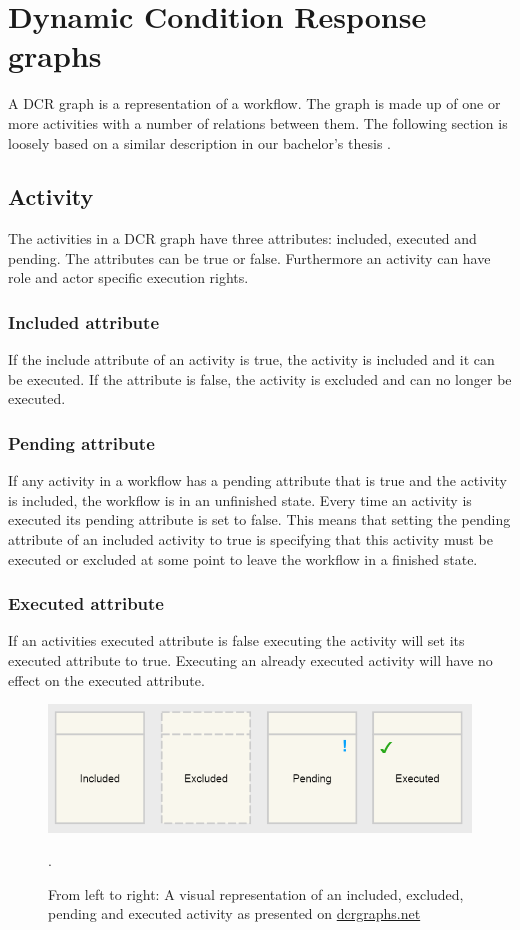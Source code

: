 \documentclass{article}
\begin{document}
	\section{Dynamic Condition Response graphs}
	\label{sec:dcr-graphs}
	A DCR graph is a representation of a workflow.
	The graph is made up of one or more activities with a number of relations between them. 
	The following section is loosely based on a similar description in our bachelor's thesis \cite{bachelor}. 

		\subsection{Activity}
		The activities in a DCR graph have three attributes: included, executed and pending. 
		The attributes can be true or false. 
		Furthermore an activity can have role and actor specific execution rights.

			\subsubsection{Included attribute}
			If the include attribute of an activity is true, the activity is included and it can be executed. 
			If the attribute is false, the activity is excluded and can no longer be executed.

			\subsubsection{Pending attribute}
			If any activity in a workflow has a pending attribute that is true and the activity is included, the workflow is in an unfinished state.
			Every time an activity is executed its pending attribute is set to false.
			This means that setting the pending attribute of an included activity to true is specifying that this activity must be executed or excluded at some point to leave the workflow in a finished state.

			\subsubsection{Executed attribute}
			If an activities executed attribute is false executing the activity will set its executed attribute to true.
			Executing an already executed activity will have no effect on the executed attribute.

		\begin{figure}[!ht]
			\centering
			\includegraphics[width=1\textwidth]{figures/activity_states.png}
		 	\caption[Activity States]
		 	{From left to right: A visual representation of an included, excluded, pending and executed activity as presented on \href{http://www.dcrgraphs.net}{dcrgraphs.net}}.
		\end{figure}
\end{document}
